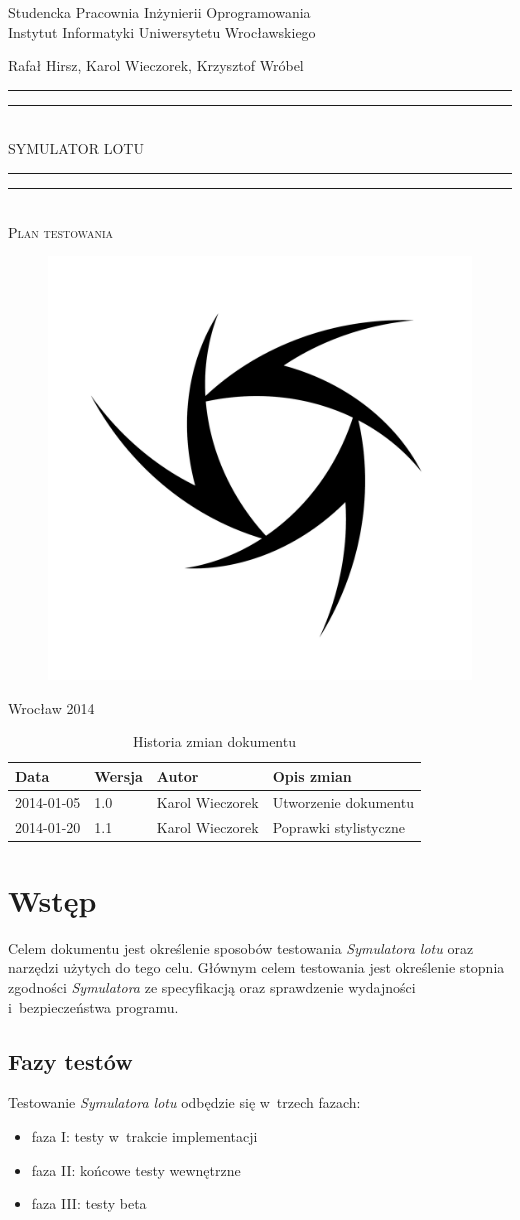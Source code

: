 \documentclass{mwrep}
\newcommand*{\titleGP}{\begingroup
\centering

{\large Studencka Pracownia Inżynierii Oprogramowania}\\Instytut Informatyki Uniwersytetu Wrocławskiego\par
\vspace*{16\baselineskip}

{\Large Rafał Hirsz, Karol Wieczorek, Krzysztof Wróbel\par}
\vspace*{\baselineskip}

\rule{\textwidth}{1.6pt}\vspace*{-\baselineskip}\vspace*{2pt}
\rule{\textwidth}{0.4pt}\\[\baselineskip]

{\Huge SYMULATOR LOTU}\\[0.2\baselineskip]

\rule{\textwidth}{0.4pt}\vspace*{-\baselineskip}\vspace{3.2pt}
\rule{\textwidth}{1.6pt}\\[\baselineskip]

\scshape
{\huge Plan testowania}\par
\vspace*{2\baselineskip}

\begin{figure}[h]
\centering
\includegraphics[width=5\baselineskip]{flightsim-team-logo.pdf}
\end{figure}
\vfill

{\large Wrocław 2014}\par

\pagebreak

\endgroup}
\begin{document}
\thispagestyle{empty}
\titleGP

\begin{center}
\begin{table}[h]
\begin{center}
\caption{Historia zmian dokumentu}\label{T:Zmiany}
\vspace{3ex}
\begin{tabularx}{1\textwidth}{|l|l|l|X|}
\hline
Data & Wersja & Autor & Opis zmian \\ \hline
2014-01-05 & 1.0 & Karol Wieczorek & Utworzenie dokumentu \\
2014-01-20 & 1.1 & Karol Wieczorek & Poprawki stylistyczne \\
\hline
\end{tabularx}
\end{center}
\end{table}
\end{center}

\pagebreak

\tableofcontents

\chapter{Wstęp}
Celem dokumentu jest określenie sposobów testowania \textit{Symulatora lotu} oraz narzędzi użytych do tego celu. Głównym celem testowania jest określenie stopnia zgodności \textit{Symulatora} ze specyfikacją oraz sprawdzenie wydajności i~bezpieczeństwa programu.

\section{Fazy testów}
Testowanie \textit{Symulatora lotu} odbędzie się w~trzech fazach:
\begin{itemize}
  \item faza I: testy w~trakcie implementacji
  \item faza II: końcowe testy wewnętrzne
  \item faza III: testy beta
\end{itemize}
\end{document}
